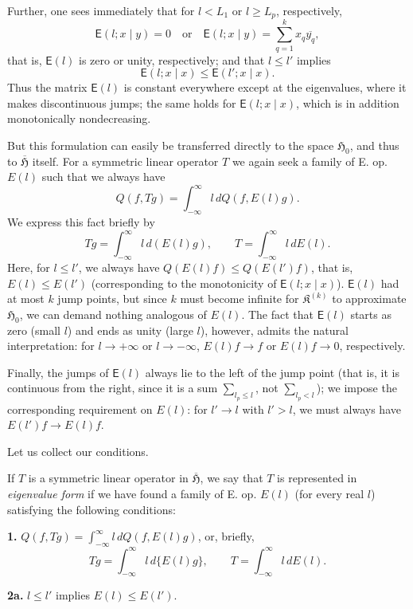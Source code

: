 \documentclass[fontsize=13pt,paper=b5,twoside,bookmarkpackage=false]{scrartcl}
\begin{document}
Further, one sees immediately that for $l<L_1$ or $l\geq L_p$, respectively,
\[
 \mathsf{E}(l;x\mid y)=0
 \quad\text{or}\quad
 \mathsf{E}(l;x\mid y)=\sum_{q=1}^{k}x_q\overline{y_q},
\]
that is, $\mathsf{E}(l)$ is zero or unity, respectively; and that $l\leq l'$ implies
\[
 \mathsf{E}(l;x\mid x)\leq\mathsf{E}(l';x\mid x).
\]
Thus the matrix $\mathsf{E}(l)$ is constant everywhere except at the eigenvalues, where it makes discontinuous jumps; the same holds for $\mathsf{E}(l;x\mid x)$, which is in addition monotonically nondecreasing.

But this formulation can easily be transferred directly to the space $\mathfrak{H}_0$, and thus to $\overline{\mathfrak{H}}$ itself. For a symmetric linear operator $T$ we again seek a family of E. op. $E(l)$ such that we always have
\[
 Q(f,Tg)=\int_{-\infty}^{\infty}l\,dQ(f,E(l)g).
\]
We express this fact briefly by
\[
 Tg=\int_{-\infty}^{\infty}l\,d(E(l)g),\qquad
 T=\int_{-\infty}^{\infty}l\,dE(l).
\]
Here, for $l\leq l'$, we always have $Q(E(l)f)\leq Q(E(l')f)$, that is, $E(l)\leq E(l')$ (corresponding to the monotonicity of $\mathsf{E}(l;x\mid x)$). $\mathsf{E}(l)$ had at most $k$ jump points, but since $k$ must become infinite for $\mathfrak{K}^{(k)}$ to approximate $\mathfrak{H}_0$, we can demand nothing analogous of $E(l)$. The fact that $\mathsf{E}(l)$ starts as zero (small $l$) and ends as unity (large $l$), however, admits the natural interpretation: for $l\to+\infty$ or $l\to-\infty$, $E(l)f\to f$ or $E(l)f\to0$, respectively.

Finally, the jumps of $\mathsf{E}(l)$ always lie to the left of the jump point (that is, it is continuous from the right, since it is a sum $\sum_{l_p\leq l}$, not $\sum_{l_p<l}$); we impose the corresponding requirement on $E(l)$: for $l'\to l$ with $l'>l$, we must always have $E(l')f\to E(l)f$.

Let us collect our conditions.

If $T$ is a symmetric linear operator in $\overline{\mathfrak{H}}$, we say that $T$ is represented in \emph{eigenvalue form} if we have found a family of E. op. $E(l)$ (for every real $l$) satisfying the following conditions:

\par\medskip\noindent{}\label{cond:IX:1}%
\textbf{1.}\enspace
\(\displaystyle Q(f,Tg)=\int_{-\infty}^{\infty}l\,dQ(f,E(l)g)\),
or, briefly,
\[
 Tg=\int_{-\infty}^{\infty}l\,d\{E(l)g\},\qquad
 T=\int_{-\infty}^{\infty}l\,dE(l).
\]
\par\noindent{}\label{cond:IX:2a}\textbf{2a.}
$l\leq l'$ implies $E(l)\leq E(l')$.
\end{document}
